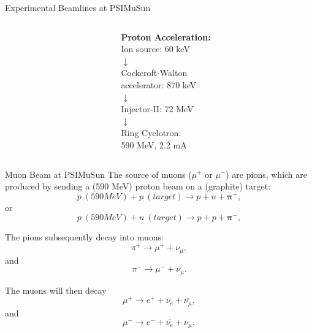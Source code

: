 \documentclass{beamer}
\newcommand\Fontvi{\fontsize{9}{7.2}\selectfont}
\begin{document}
\begin{frame}{Experimental Beamlines at PSI}{MuSun}
\begin{columns}[onlytextwidth]
\begin{column}{0.25\textwidth}
  \end{column}
   \begin{column}{0.3\textwidth}
   \normalsize{\textbf{Proton Acceleration:} \\Ion source: 60 keV \\ $\downarrow$\\ Cockcroft-Walton\\ accelerator: 870 keV \\ $\downarrow$ \\ Injector-II: 72 MeV \\ $\downarrow$ \\ Ring Cyclotron: \\ 590 MeV, 2.2 mA}
   \end{column}
  \end{columns}
  \let\thefootnote\relax{}
\end{frame}

\begin{frame}{Muon Beam at PSI}{MuSun}
\Fontvi
The source of muons ($\mu^+$ or $\mu^-$) are pions, which are produced by sending a (590 MeV) proton beam on a (graphite) target:  
\begin{equation}
p ~(590 MeV) + p ~(target) \rightarrow p + n + \boldsymbol{\pi^+},
\end{equation}
or 
\begin{equation}
p ~(590 MeV) + n ~(target) \rightarrow p + p + \boldsymbol{\pi^-},
\end{equation}

The pions subsequently decay into muons:
\begin{equation}
\pi^+ \rightarrow \mu^+ + \nu_{\mu},
\end{equation}
and
\begin{equation}
\pi^- \rightarrow \mu^- + \bar{\nu_{\mu}}.
\end{equation}

The muons will then decay
\begin{equation}
\mu^+ \rightarrow e^+ + \nu_{e} + \bar{\nu_{\mu}},
\label{eq:mu+}
\end{equation}
and
\begin{equation}
\mu^- \rightarrow e^- + \bar{\nu_{e}} + \nu_{\mu},
\label{eq:mu-}
\end{equation}

\end{frame}
\end{document}
